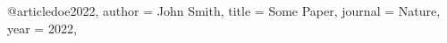 @article{doe2022,
  author = {John Smith},
  title = {Some Paper},
  journal = {Nature},
  year = {2022},
}
